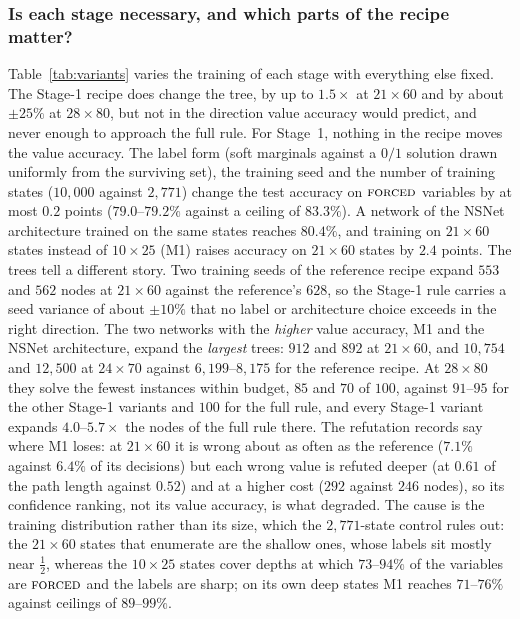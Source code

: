 \documentclass[final,5p,times,twocolumn,authoryear]{elsarticle}
\newcommand{\FORCED}{\textsc{forced}}
\begin{document}
\subsubsection{Is each stage necessary, and which parts of the recipe matter?}
Table~\ref{tab:variants} varies the training of each stage with everything else fixed. The Stage-1 recipe does change the tree, by up to $1.5\times$ at $21\times60$ and by about $\pm25\%$ at $28\times80$, but not in the direction value accuracy would predict, and never enough to approach the full rule. For Stage~1, nothing in the recipe moves the value accuracy. The label form (soft marginals against a $0/1$ solution drawn uniformly from the surviving set), the training seed and the number of training states ($10{,}000$ against $2{,}771$) change the test accuracy on $\FORCED$ variables by at most $0.2$ points ($79.0$--$79.2\%$ against a ceiling of $83.3\%$). A network of the NSNet architecture \citep{li2022nsnet} trained on the same states reaches $80.4\%$, and training on $21\times60$ states instead of $10\times25$ (M1) raises accuracy on $21\times60$ states by $2.4$ points. The trees tell a different story. Two training seeds of the reference recipe expand $553$ and $562$ nodes at $21\times60$ against the reference's $628$, so the Stage-1 rule carries a seed variance of about $\pm10\%$ that no label or architecture choice exceeds in the right direction. The two networks with the \emph{higher} value accuracy, M1 and the NSNet architecture, expand the \emph{largest} trees: $912$ and $892$ at $21\times60$, and $10{,}754$ and $12{,}500$ at $24\times70$ against $6{,}199$--$8{,}175$ for the reference recipe. At $28\times80$ they solve the fewest instances within budget, $85$ and $70$ of $100$, against $91$--$95$ for the other Stage-1 variants and $100$ for the full rule, and every Stage-1 variant expands $4.0$--$5.7\times$ the nodes of the full rule there. The refutation records say where M1 loses: at $21\times60$ it is wrong about as often as the reference ($7.1\%$ against $6.4\%$ of its decisions) but each wrong value is refuted deeper (at $0.61$ of the path length against $0.52$) and at a higher cost ($292$ against $246$ nodes), so its confidence ranking, not its value accuracy, is what degraded. The cause is the training distribution rather than its size, which the $2{,}771$-state control rules out: the $21\times60$ states that enumerate are the shallow ones, whose labels sit mostly near $\tfrac12$, whereas the $10\times25$ states cover depths at which $73$--$94\%$ of the variables are $\FORCED$ and the labels are sharp; on its own deep states M1 reaches $71$--$76\%$ against ceilings of $89$--$99\%$.
\end{document}

